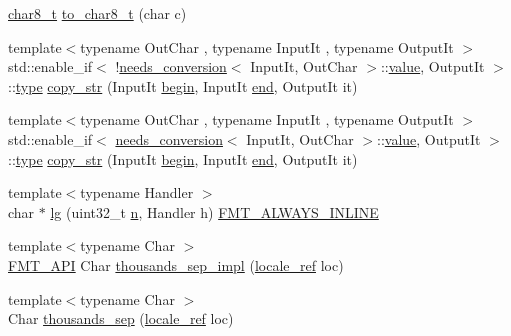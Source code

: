 \begin{DoxyCompactItemize}
\item 
\hyperlink{format_8h_ad71c872603735b57c8417f76de44077b}{char8\+\_\+t} \hyperlink{namespaceinternal_aec25b0e61826253efb4ca1d710a60a0d}{to\+\_\+char8\+\_\+t} (char c)
\item 
{\footnotesize template$<$typename Out\+Char , typename Input\+It , typename Output\+It $>$ }\\std\+::enable\+\_\+if$<$ !\hyperlink{structinternal_1_1needs__conversion}{needs\+\_\+conversion}$<$ Input\+It, Out\+Char $>$\+::\hyperlink{classinternal_1_1value}{value}, Output\+It $>$\+::\hyperlink{namespaceinternal_a8661864098ac0acff9a6dd7e66f59038}{type} \hyperlink{namespaceinternal_a8d09228af5e19a701d0d6372a036cf24}{copy\+\_\+str} (Input\+It \hyperlink{namespaceinternal_a265f36d9dee68d3f44381347ef2fd5cb}{begin}, Input\+It \hyperlink{namespaceinternal_a94820de1710dc8038fa6f188adfe299b}{end}, Output\+It it)
\item 
{\footnotesize template$<$typename Out\+Char , typename Input\+It , typename Output\+It $>$ }\\std\+::enable\+\_\+if$<$ \hyperlink{structinternal_1_1needs__conversion}{needs\+\_\+conversion}$<$ Input\+It, Out\+Char $>$\+::\hyperlink{classinternal_1_1value}{value}, Output\+It $>$\+::\hyperlink{namespaceinternal_a8661864098ac0acff9a6dd7e66f59038}{type} \hyperlink{namespaceinternal_a6ad6580819e6e957d9c2cab372b6e620}{copy\+\_\+str} (Input\+It \hyperlink{namespaceinternal_a265f36d9dee68d3f44381347ef2fd5cb}{begin}, Input\+It \hyperlink{namespaceinternal_a94820de1710dc8038fa6f188adfe299b}{end}, Output\+It it)
\item 
{\footnotesize template$<$typename Handler $>$ }\\char $\ast$ \hyperlink{namespaceinternal_a6101fd132aee88b9c888cb7e82be20a1}{lg} (uint32\+\_\+t \hyperlink{format_8h_a9ab7e5832cef391eb8b1505a601fb215}{n}, Handler h) \hyperlink{format_8h_a701339e31b08c541a11ed944cc20b856}{F\+M\+T\+\_\+\+A\+L\+W\+A\+Y\+S\+\_\+\+I\+N\+L\+I\+NE}
\item 
{\footnotesize template$<$typename Char $>$ }\\\hyperlink{core_8h_a9a4960b70582ed2620911a0b75dce0b5}{F\+M\+T\+\_\+\+A\+PI} Char \hyperlink{namespaceinternal_a0eb92e21789faf5174aa9bb86bb78539}{thousands\+\_\+sep\+\_\+impl} (\hyperlink{classinternal_1_1locale__ref}{locale\+\_\+ref} loc)
\item 
{\footnotesize template$<$typename Char $>$ }\\Char \hyperlink{namespaceinternal_a604560431c478cefdd7b771e7307d0d2}{thousands\+\_\+sep} (\hyperlink{classinternal_1_1locale__ref}{locale\+\_\+ref} loc)

\end{DoxyCompactItemize}
